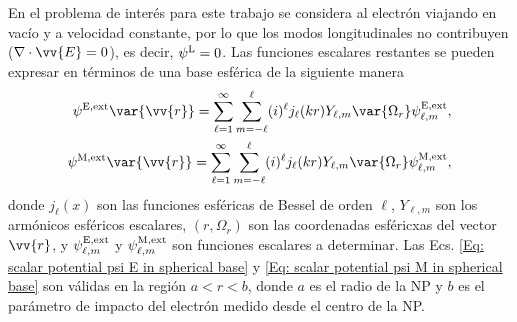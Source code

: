 En el problema de interés para este trabajo se considera al electrón viajando en vacío y a velocidad constante, por lo que los modos longitudinales no contribuyen ($\nabla\cdot\vv{E}=0$), es decir, $\psi^{\rm L} = 0$. Las funciones escalares restantes se pueden expresar en términos de una base esférica de la siguiente manera \cite{de1999relativistic}
\begin{align}
\psi^{\rm E, ext}\var{\vv{r}} = \sum_{\ell=1}^{\infty}\sum_{m=-\ell}^{\ell}(i)^{\ell} j_{\ell}(kr) Y_{\ell, m}\var{\Omega_r}\psi_{\ell,m}^{\rm E, ext},\label{Eq: scalar potential psi E in spherical base}\\
\psi^{\rm M, ext}\var{\vv{r}} = \sum_{\ell=1}^{\infty}\sum_{m=-\ell}^{\ell}(i)^{\ell} j_{\ell}(kr) Y_{\ell, m}\var{\Omega_r}\psi_{\ell,m}^{\rm M, ext}, \label{Eq: scalar potential psi M in spherical base}
\end{align}
donde $j_{\ell}(x)$ son las funciones esféricas de Bessel de orden $\ell$, $Y_{\ell, m}$ son los armónicos esféricos escalares, $(r, \Omega_r)$ son las coordenadas esféricxas del vector $\vv{r}$, y $\psi_{\ell,m}^{\rm E, ext}$ y $\psi_{\ell,m}^{\rm M, ext}$ son funciones escalares a determinar. Las Ecs. \eqref{Eq: scalar potential psi E in spherical base} y \eqref{Eq: scalar potential psi M in spherical base} son válidas en la región $a < r < b$, donde $a$ es el radio de la NP y $b$ es el parámetro de impacto del electrón medido desde el centro de la NP.  

